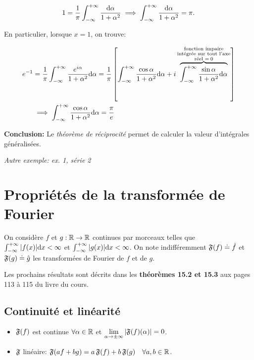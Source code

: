 \begin{example}
   \[1 = \frac{1}{\pi} \int_{-\infty}^{+\infty} \frac{\mathrm{d}\alpha}{1 + \alpha^2} \implies \int_{-\infty}^{+\infty} \frac{\mathrm{d}\alpha}{1 + \alpha^2} = \pi.
   \]
    
    En particulier, lorsque $x = 1$, on trouve:
    
    \begin{align*}
    e^{-1} &=
    \frac{1}{\pi} \int_{-\infty}^{+\infty} \frac{e^{i \alpha}}{1 + \alpha^2}\mathrm{d}\alpha =
    \frac{1}{\pi} \left[ \int_{-\infty}^{+\infty} \frac{\cos \alpha}{1 + \alpha^2} \mathrm{d}\alpha +
    i \overbrace{\int_{-\infty}^{+\infty} \frac{\sin \alpha}{1 + \alpha^2} \mathrm{d}\alpha}^{\substack{\textrm{fonction impaire} \\ \textrm{intégrée sur tout l'axe} \\ \textrm{réel } = \> 0}} \right]
    \\&\implies
    \int_{-\infty}^{+\infty} \frac{\cos \alpha}{1 + \alpha^2} \mathrm{d}\alpha = \frac{\pi}{e}
    \end{align*}

\end{example}

\textbf{Conclusion:} Le \textit{théorème de réciprocité} permet de calculer la valeur d'intégrales généralisées.

\textit{Autre exemple: ex. 1, série 2}



\section{Propriétés de la transformée de Fourier}


On considère $f$ et $g: \mathbb{R} \rightarrow \mathbb{R}$ continues par morceaux telles que $\int_{-\infty}^{+\infty} |f(x)| \mathrm{d}x < \infty$ et $\int_{-\infty}^{+\infty} |g(x)| \mathrm{d}x < \infty$.
On note indifféremment $\mathfrak{F}(f) \doteq \hat{f}$ et $\mathfrak{F}(g) \doteq \hat{g}$ les transformées de Fourier de $f$ et de $g$.

\begin{note}
    Les prochains résultats sont décrits dans les \textbf{théorèmes 15.2 et 15.3} aux pages 113 à 115 du livre du cours.
\end{note}


\subsection{Continuité et linéarité}

\begin{itemize}
\item
$\mathfrak{F}(f)$ est continue $\forall \alpha \in \mathbb{R}$ et $\lim\limits_{\alpha \rightarrow \pm \infty} |\mathfrak{F}(f)(\alpha)| = 0$.
\item
$\mathfrak{F}$ linéaire: $\mathfrak{F}(af + bg) = a\,\mathfrak{F}(f) + b\,\mathfrak{F}(g) \quad \forall a,b \in \mathbb{R}$.
\end{itemize}


